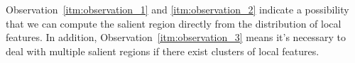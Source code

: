 Observation~\ref{itm:observation_1} and \ref{itm:observation_2} indicate a possibility that we can compute the salient region directly from the distribution of local features. In addition, Observation~\ref{itm:observation_3} means it's necessary to deal with multiple salient regions if there exist clusters of local features.
